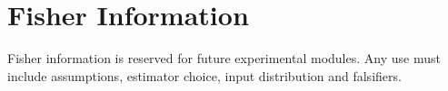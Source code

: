 \section{Fisher Information}

Fisher information is reserved for future experimental modules. Any use must include assumptions, estimator choice, input distribution and falsifiers.

